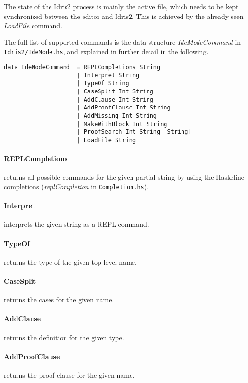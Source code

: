 \documentclass{article}
\begin{document}
The state of the Idris2 process is mainly the active file, which needs to be kept synchronized between the editor and Idris2.
This is achieved by the already seen \emph{LoadFile} command.

The full list of supported commands is the data structure \emph{IdeModeCommand} in \texttt{Idris2/IdeMode.hs}, and explained in further detail in the following.

\begin{verbatim}
data IdeModeCommand  = REPLCompletions String
                     | Interpret String
                     | TypeOf String
                     | CaseSplit Int String
                     | AddClause Int String
                     | AddProofClause Int String
                     | AddMissing Int String
                     | MakeWithBlock Int String
                     | ProofSearch Int String [String]
                     | LoadFile String
\end{verbatim}

\paragraph{REPLCompletions} returns all possible commands for the given partial string by using the Haskeline completions (\emph{replCompletion} in \texttt{Completion.hs}).

\paragraph{Interpret} interprets the given string as a REPL command.

\paragraph{TypeOf} returns the type of the given top-level name.

\paragraph{CaseSplit} returns the cases for the given name.

\paragraph{AddClause} returns the definition for the given type.

\paragraph{AddProofClause} returns the proof clause for the given name.
\end{document}
